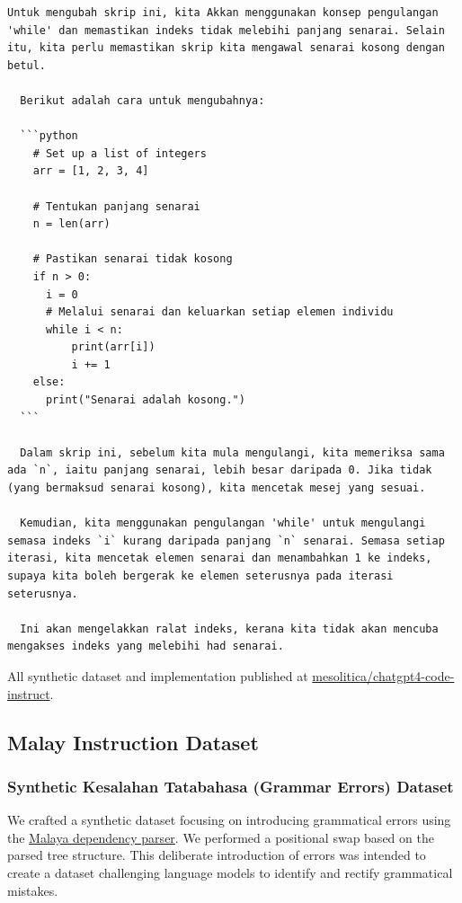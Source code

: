 \documentclass{article}
\begin{document}
\begin{lstlisting}[breaklines=true]
  Untuk mengubah skrip ini, kita Akkan menggunakan konsep pengulangan 'while' dan memastikan indeks tidak melebihi panjang senarai. Selain itu, kita perlu memastikan skrip kita mengawal senarai kosong dengan betul.

  Berikut adalah cara untuk mengubahnya:

  ```python
    # Set up a list of integers
    arr = [1, 2, 3, 4]

    # Tentukan panjang senarai
    n = len(arr)

    # Pastikan senarai tidak kosong
    if n > 0:
      i = 0
      # Melalui senarai dan keluarkan setiap elemen individu
      while i < n:
          print(arr[i])
          i += 1
    else:
      print("Senarai adalah kosong.")
  ```

  Dalam skrip ini, sebelum kita mula mengulangi, kita memeriksa sama ada `n`, iaitu panjang senarai, lebih besar daripada 0. Jika tidak (yang bermaksud senarai kosong), kita mencetak mesej yang sesuai.

  Kemudian, kita menggunakan pengulangan 'while' untuk mengulangi semasa indeks `i` kurang daripada panjang `n` senarai. Semasa setiap iterasi, kita mencetak elemen senarai dan menambahkan 1 ke indeks, supaya kita boleh bergerak ke elemen seterusnya pada iterasi seterusnya.

  Ini akan mengelakkan ralat indeks, kerana kita tidak akan mencuba mengakses indeks yang melebihi had senarai.
\end{lstlisting}

All synthetic dataset and implementation published at \href{https://huggingface.co/datasets/mesolitica/chatgpt4-code-instruct}{mesolitica/chatgpt4-code-instruct}.

\subsection{Malay Instruction Dataset}

\subsubsection{Synthetic Kesalahan Tatabahasa (Grammar Errors) Dataset}

We crafted a synthetic dataset focusing on introducing grammatical errors using the \href{https://malaya.readthedocs.io/en/stable/load-dependency.html}{Malaya dependency parser}. We performed a positional swap based on the parsed tree structure. This deliberate introduction of errors was intended to create a dataset challenging language models to identify and rectify grammatical mistakes.
\end{document}
